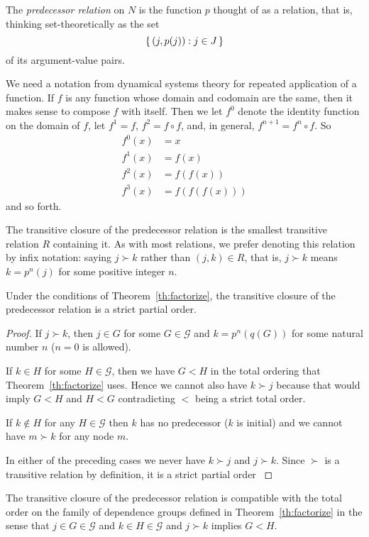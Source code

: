 The \emph{predecessor relation} on $N$ is the function $p$ thought
of as a relation, that is, thinking set-theoretically
\citep[Section~7]{halmos-set-theory} as the set
$$
   \{\,  (j, p(j)) : j \in J  \,\}
$$
of its argument-value pairs.

We need a notation from dynamical systems theory for repeated application
of a function.  If $f$ is any function whose domain and codomain are the same,
then it makes sense to compose $f$ with itself.  Then we let $f^0$ denote
the identity function on the domain of $f$, let $f^1 = f$, $f^2 = f \circ f$,
and, in general, $f^{n + 1} = f^n \circ f$.
So
\begin{align*}
   f^0(x) & = x
   \\
   f^1(x) & = f(x)
   \\
   f^2(x) & = f(f(x))
   \\
   f^3(x) & = f(f(f(x)))
\end{align*}
and so forth.

The transitive closure of the predecessor relation
is the smallest transitive relation $R$ containing it.
As with most relations, we prefer denoting this relation by infix notation:
saying $j \succ k$ rather than $(j, k) \in R$, that is, $j \succ k$ means
$k = p^n(j)$ for some positive integer $n$.

\begin{theorem} \label{th:transitive-closure}
Under the conditions of Theorem~\ref{th:factorize},
the transitive closure of the predecessor relation is a strict partial order.
\end{theorem}
\begin{proof}
If $j \succ k$, then $j \in G$ for some $G \in \mathcal{G}$ and
$k = p^n(q(G))$ for some natural number $n$ ($n = 0$ is allowed).

If $k \in H$ for some $H \in \mathcal{G}$,
then we have $G < H$ in the total ordering
that Theorem~\ref{th:factorize} uses.
Hence we cannot also have $k \succ j$ because that would imply $G < H$
and $H < G$ contradicting $<$ being a strict total order.

If $k \notin H$ for any $H \in \mathcal{G}$ then $k$ has no predecessor
($k$ is initial) and we cannot have $m \succ k$ for any node $m$.

In either of the preceding cases we never have $k \succ j$ and $j \succ k$.
Since $\succ$ is a transitive relation by definition, it is
a strict partial order \citep[Section~14]{halmos-set-theory}
\end{proof}
\begin{corollary} \label{cor:compatible}
The transitive closure of the predecessor relation is compatible with
the total order on the family of dependence groups defined
in Theorem~\ref{th:factorize} in the sense that
$j \in G \in \mathcal{G}$ and $k \in H \in \mathcal{G}$ and $j \succ k$
implies $G < H$.
\end{corollary}


